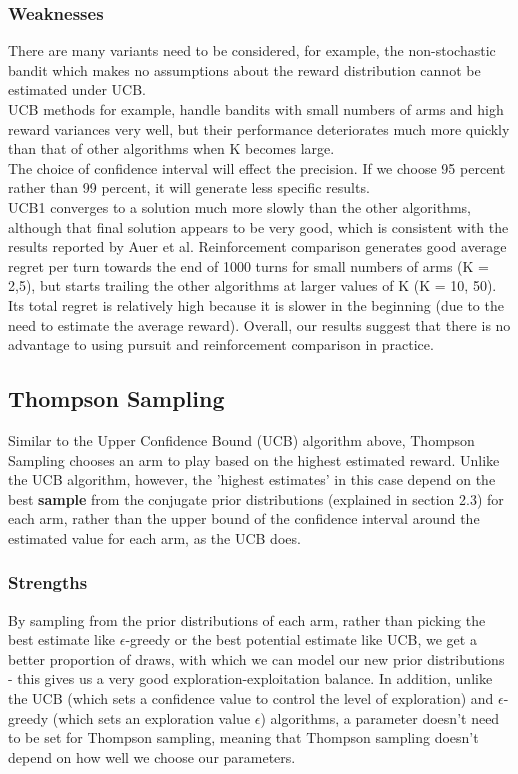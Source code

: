 \subsubsection{Weaknesses}
There are many variants need to be considered, for example, the non-stochastic bandit which makes no assumptions about the reward distribution cannot be estimated under UCB.
\\UCB methods for example, handle bandits with small numbers of arms and high reward variances very well, but their performance deteriorates much more quickly than that of other algorithms when K becomes large.\citep{Kuleshov}
\\The choice of confidence interval will effect the precision. If we choose 95 percent rather than 99 percent, it will generate less specific results.
\\UCB1 converges to a solution much more slowly than the other algorithms, although that final solution appears to be very good, which is consistent with the results reported by Auer et al. Reinforcement comparison generates good average regret per turn towards the end of 1000 turns for small numbers of arms (K = 2,5), but starts trailing the other algorithms at larger values of K (K = 10, 50). Its total regret is relatively high because it is slower in the beginning (due to the need to estimate the average reward). Overall, our results suggest that there is no advantage to using pursuit and reinforcement comparison in practice. \citep{Kuleshov}

\subsection{Thompson Sampling}
Similar to the Upper Confidence Bound (UCB) algorithm above, Thompson Sampling chooses an arm to play based on the highest estimated reward. Unlike the UCB algorithm, however, the 'highest estimates' in this case depend on the best \textbf{sample} from the conjugate prior distributions (explained in section 2.3) for each arm, rather than the upper bound of the confidence interval around the estimated value for each arm, as the UCB does.

\subsubsection{Strengths}
By sampling from the prior distributions of each arm, rather than picking the best estimate like $\epsilon$-greedy or the best potential estimate like UCB, we get a better proportion of draws, with which we can model our new prior distributions - this gives us a very good exploration-exploitation balance. In addition, unlike the UCB (which sets a confidence value to control the level of exploration) and $\epsilon$-greedy (which sets an exploration value $\epsilon$) algorithms, a parameter doesn't need to be set for Thompson sampling, meaning that Thompson sampling doesn't depend on how well we choose our parameters.

